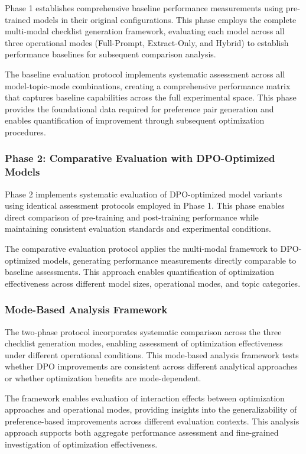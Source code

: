 Phase 1 establishes comprehensive baseline performance measurements using pre-trained models in their original configurations. This phase employs the complete multi-modal checklist generation framework, evaluating each model across all three operational modes (Full-Prompt, Extract-Only, and Hybrid) to establish performance baselines for subsequent comparison analysis.

The baseline evaluation protocol implements systematic assessment across all model-topic-mode combinations, creating a comprehensive performance matrix that captures baseline capabilities across the full experimental space. This phase provides the foundational data required for preference pair generation and enables quantification of improvement through subsequent optimization procedures.

\subsubsection{Phase 2: Comparative Evaluation with DPO-Optimized Models}

Phase 2 implements systematic evaluation of DPO-optimized model variants using identical assessment protocols employed in Phase 1. This phase enables direct comparison of pre-training and post-training performance while maintaining consistent evaluation standards and experimental conditions.

The comparative evaluation protocol applies the multi-modal framework to DPO-optimized models, generating performance measurements directly comparable to baseline assessments. This approach enables quantification of optimization effectiveness across different model sizes, operational modes, and topic categories.

\subsubsection{Mode-Based Analysis Framework}

The two-phase protocol incorporates systematic comparison across the three checklist generation modes, enabling assessment of optimization effectiveness under different operational conditions. This mode-based analysis framework tests whether DPO improvements are consistent across different analytical approaches or whether optimization benefits are mode-dependent.

The framework enables evaluation of interaction effects between optimization approaches and operational modes, providing insights into the generalizability of preference-based improvements across different evaluation contexts. This analysis approach supports both aggregate performance assessment and fine-grained investigation of optimization effectiveness.

